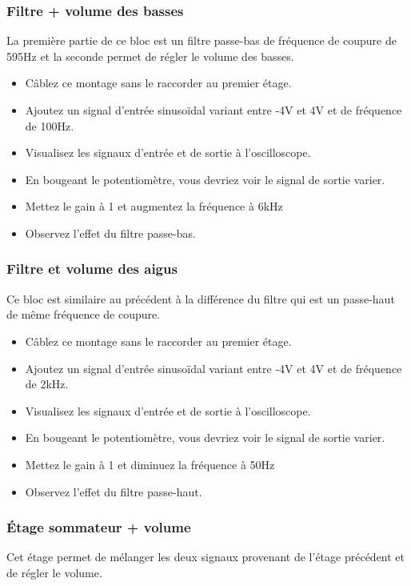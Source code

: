 \subsubsection{Filtre + volume des basses}
La première partie de ce bloc est un filtre passe-bas de fréquence de coupure de 595Hz et la seconde permet de régler le volume des basses.

\begin{itemize}
\item Câblez ce montage sans le raccorder au premier étage.
\item Ajoutez un signal d’entrée sinusoïdal variant entre -4V et 4V et de fréquence de 100Hz.
\item Visualisez les signaux d’entrée et de sortie à l’oscilloscope.
\item En bougeant le potentiomètre, vous devriez voir le signal de sortie varier.
\item Mettez le gain à 1 et augmentez la fréquence à 6kHz
\item Observez l’effet du filtre passe-bas.
\end{itemize}

\subsubsection{Filtre et volume des aigus}
Ce bloc est similaire au précédent à la différence du filtre qui est un passe-haut de même fréquence de coupure.

\begin{itemize}
\item Câblez ce montage sans le raccorder au premier étage.
\item Ajoutez un signal d’entrée sinusoïdal variant entre -4V et 4V et de fréquence de 2kHz.
\item Visualisez les signaux d’entrée et de sortie à l’oscilloscope.
\item En bougeant le potentiomètre, vous devriez voir le signal de sortie varier.
\item Mettez le gain à 1 et diminuez la fréquence à 50Hz
\item Observez l’effet du filtre passe-haut.
\end{itemize}

\subsubsection{Étage sommateur + volume}
Cet étage permet de mélanger les deux signaux provenant de l’étage précédent et de régler le volume.

